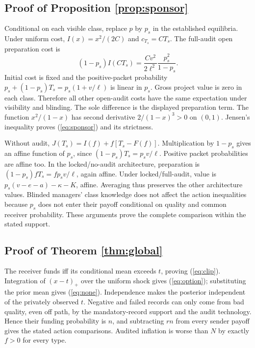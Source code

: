 \documentclass[11pt]{article}
\begin{document}
\subsection{Proof of Proposition \ref{prop:sponsor}}\label{app:sponsor}
Conditional on each visible class, replace $p$ by $p_s$ in the established equilibria. Under uniform cost, $I(x)=x^2/(2C)$ and $c_{T_s}=CT_s$. The full-audit open preparation cost is
\[
(1-p_s)I(CT_s)=\frac{Cv^2}{2\ell^2}\frac{p_s^2}{1-p_s}.
\]
Initial cost is fixed and the positive-packet probability $p_s+(1-p_s)T_s=p_s(1+v/\ell)$ is linear in $p_s$. Gross project value is zero in each class. Therefore all other open-audit costs have the same expectation under visibility and blinding. The sole difference is the displayed preparation term. The function $x^2/(1-x)$ has second derivative $2/(1-x)^3>0$ on $(0,1)$. Jensen's inequality proves (\ref{eq:sponsor}) and its strictness.

Without audit, $J(T_s)=I(f)+f[T_s-F(f)]$. Multiplication by $1-p_s$ gives an affine function of $p_s$, since $(1-p_s)T_s=p_sv/\ell$. Positive packet probabilities are affine too. In the locked/no-audit architecture, preparation is $(1-p_s)fT_s=fp_sv/\ell$, again affine. Under locked/full-audit, value is $p_s(v-e-a)-\kappa-K$, affine. Averaging thus preserves the other architecture values. Blinded managers' class knowledge does not affect the action inequalities because $p_s$ does not enter their payoff conditional on quality and common receiver probability. These arguments prove the complete comparison within the stated support.
\subsection{Proof of Theorem \ref{thm:global}}\label{app:global}
The receiver funds iff its conditional mean exceeds $t$, proving (\ref{eq:clip}). Integration of $(x-t)_+$ over the uniform shock gives (\ref{eq:option}); substituting the prior mean gives (\ref{eq:none}). Independence makes the posterior independent of the privately observed $t$. Negative and failed records can only come from bad quality, even off path, by the mandatory-record support and the audit technology. Hence their funding probability is $n$, and subtracting $rn$ from every sender payoff gives the stated action comparisons. Audited inflation is worse than $N$ by exactly $f>0$ for every type.
\end{document}
